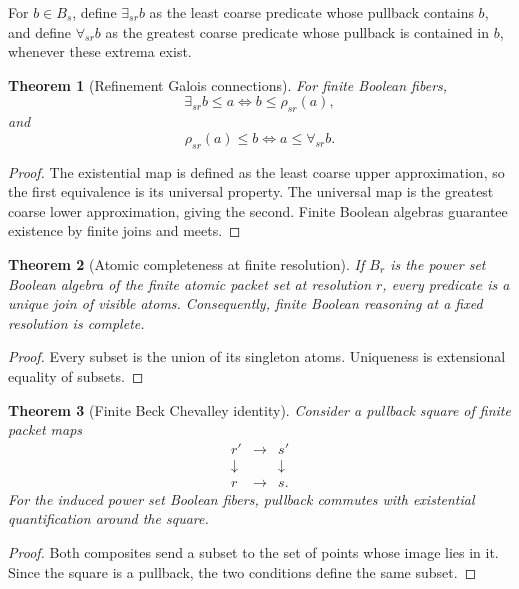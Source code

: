 \documentclass{aomart}
\newtheorem{theorem}{Theorem}[section]
\theoremstyle{definition}
\theoremstyle{remark}
\begin{document}
\begin{definition}\label{def:logic_adjoints}
For \(b\in B_s\), define \(\exists_{sr}b\) as the least coarse predicate whose pullback contains \(b\), and define \(\forall_{sr}b\) as the greatest coarse predicate whose pullback is contained in \(b\), whenever these extrema exist.
\end{definition}

\begin{theorem}[Refinement Galois connections]\label{thm:logic_galois}
For finite Boolean fibers,
\[
 \boxed{
 \exists_{sr}b\le a
 \iff
 b\le\rho_{sr}(a),
 }
\]
and
\[
 \boxed{
 \rho_{sr}(a)\le b
 \iff
 a\le\forall_{sr}b.
 }
\]
\end{theorem}

\begin{proof}
The existential map is defined as the least coarse upper approximation, so the first equivalence is its universal property. The universal map is the greatest coarse lower approximation, giving the second. Finite Boolean algebras guarantee existence by finite joins and meets.
\end{proof}

\begin{theorem}[Atomic completeness at finite resolution]\label{thm:logic_completeness}
If \(B_r\) is the power set Boolean algebra of the finite atomic packet set at resolution \(r\), every predicate is a unique join of visible atoms. Consequently, finite Boolean reasoning at a fixed resolution is complete.
\end{theorem}

\begin{proof}
Every subset is the union of its singleton atoms. Uniqueness is extensional equality of subsets.
\end{proof}

\begin{theorem}[Finite Beck Chevalley identity]\label{thm:beck_chevalley}
Consider a pullback square of finite packet maps
\[
 \begin{array}{ccc}
 r'&\longrightarrow&s'\\
 \downarrow&&\downarrow\\
 r&\longrightarrow&s.
 \end{array}
\]
For the induced power set Boolean fibers, pullback commutes with existential quantification around the square.
\end{theorem}

\begin{proof}
Both composites send a subset to the set of points whose image lies in it. Since the square is a pullback, the two conditions define the same subset.
\end{proof}
\end{document}
